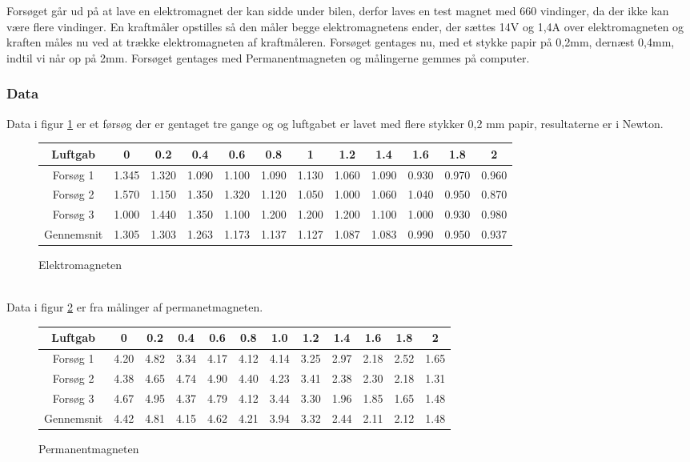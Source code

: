 Forsøget går ud på at lave en elektromagnet der kan sidde under bilen, derfor laves en test magnet med 660 vindinger, da der ikke kan være flere vindinger. En kraftmåler opstilles så den måler begge elektromagnetens ender, der sættes 14V og 1,4A over elektromagneten og kraften måles nu ved at trække elektromagneten af kraftmåleren. Forsøget gentages nu, med et stykke papir på 0,2mm, dernæst 0,4mm, indtil vi når op på 2mm. Forsøget gentages med Permanentmagneten og målingerne gemmes på computer. \\



\subsubsection*{Data}
Data i figur \ref{elektrotabel} er et førsøg der er gentaget tre gange og og luftgabet er lavet med flere stykker 0,2 mm papir, resultaterne er i Newton. \\
\begin{figure}[h!]
\begin{tabular}{|c|c|c|c|c|c|c|c|c|c|c|c|}
\hline 
Luftgab & 0 & 0.2 & 0.4 & 0.6 & 0.8 & 1 & 1.2 & 1.4 & 1.6 & 1.8 & 2 \\ 
\hline 
Forsøg 1 & 1.345 & 1.320 & 1.090 & 1.100 & 1.090 & 1.130 & 1.060 & 1.090 & 0.930 & 0.970 & 0.960 \\ 
\hline 
Forsøg 2 & 1.570 & 1.150 & 1.350 & 1.320 & 1.120 & 1.050 & 1.000 & 1.060 & 1.040 & 0.950 & 0.870 \\ 
\hline 
Forsøg 3 & 1.000 & 1.440 & 1.350 & 1.100 & 1.200 & 1.200 & 1.200 & 1.100 & 1.000 & 0.930 & 0.980 \\ 
\hline 
Gennemsnit & 1.305 & 1.303 & 1.263 & 1.173 & 1.137 & 1.127 & 1.087 & 1.083 & 0.990 & 0.950 & 0.937 \\ 
\hline 
\end{tabular}
\caption{Elektromagneten}
\label{elektrotabel}
\end{figure} \\

Data i figur \ref{permtabel} er fra målinger af permanetmagneten.\\

\begin{figure}[h!]
\begin{tabular}{|c|c|c|c|c|c|c|c|c|c|c|c|}
\hline
Luftgab & 0 & 0.2 & 0.4 & 0.6 & 0.8 & 1.0 & 1.2 & 1.4 & 1.6 & 1.8 & 2 \\
\hline
Forsøg 1 & 4.20 & 4.82 & 3.34 & 4.17 & 4.12 & 4.14 & 3.25 & 2.97 & 2.18 & 2.52 & 1.65 \\
\hline
Forsøg 2 & 4.38 & 4.65 & 4.74 & 4.90 & 4.40 & 4.23 & 3.41 & 2.38 & 2.30 & 2.18 & 1.31 \\
\hline
Forsøg 3 & 4.67 & 4.95 & 4.37 & 4.79 & 4.12 & 3.44 & 3.30 & 1.96 & 1.85 & 1.65 & 1.48 \\
\hline 
Gennemsnit & 4.42 & 4.81 & 4.15 & 4.62 & 4.21 & 3.94 & 3.32 & 2.44 & 2.11 & 2.12 & 1.48 \\
\hline
\end{tabular} 
\caption{Permanentmagneten}
\label{permtabel}
\end{figure}

